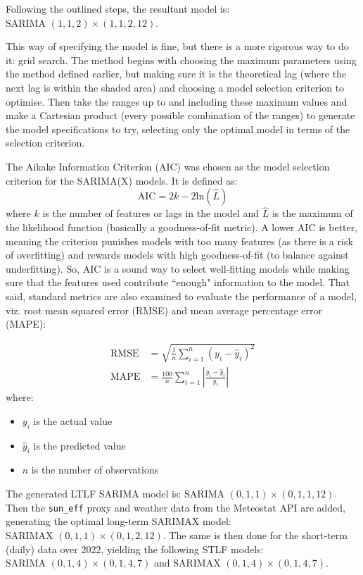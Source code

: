 \documentclass[12pt]{scrreprt}
\begin{document}
Following the outlined steps, the resultant model is: $\textrm{SARIMA }(1,1,2)\times(1,1,2,12)$.

This way of specifying the model is fine, but there is a more rigorous way to do it: grid search. The method begins with choosing the maximum parameters using the method defined earlier, but making sure it is the theoretical lag (where the next lag is within the shaded area) and choosing a model selection criterion to optimise. Then take the ranges up to and including these maximum values and make a Cartesian product (every possible combination of the ranges) to generate the model specifications to try, selecting only the optimal model in terms of the selection criterion.

The Aikake Information Criterion (AIC) was chosen as the model selection criterion for the SARIMA(X) models. It is defined as:
\[\textrm{AIC} = 2k - 2\textrm{ln}(\hat{L})\]
where $k$ is the number of features or lags in the model and $\hat{L}$ is the maximum of the likelihood function (basically a goodness-of-fit metric). A lower AIC is better, meaning the criterion punishes models with too many features (as there is a risk of overfitting) and rewards models with high goodness-of-fit (to balance against underfitting). So, AIC is a sound way to select well-fitting models while making sure that the features used contribute ``enough" information to the model. That said, standard metrics are also examined to evaluate the performance of a model, viz. root mean squared error (RMSE) and mean average percentage error (MAPE):

\begin{equation}
    \begin{split}
        \text{RMSE} &= \sqrt{\frac{1}{n} \sum_{i=1}^{n} (y_i - \hat{y}_i)^2} \\
        \text{MAPE} &= \frac{100}{n} \sum_{i=1}^{n} \left| \frac{y_i - \hat{y}_i}{y_i} \right|
    \end{split}
\end{equation}
where:
\begin{itemize}
    \item $y_i$ is the actual value
    \item $\hat{y}_i$ is the predicted value
    \item $n$ is the number of observations
\end{itemize}

The generated LTLF SARIMA model is: $\textrm{SARIMA }(0,1,1)\times(0,1,1,12)$.
Then the \texttt{sun\_eff} proxy and weather data from the Meteostat API are added, generating the optimal long-term SARIMAX model: $\textrm{SARIMAX }(0,1,1)\times(0,1,2,12)$.
The same is then done for the short-term (daily) data over 2022, yielding the following STLF models: $\textrm{SARIMA }(0,1,4)\times(0,1,4,7)$ and $\textrm{SARIMAX }(0,1,4)\times(0,1,4,7)$.
\end{document}
